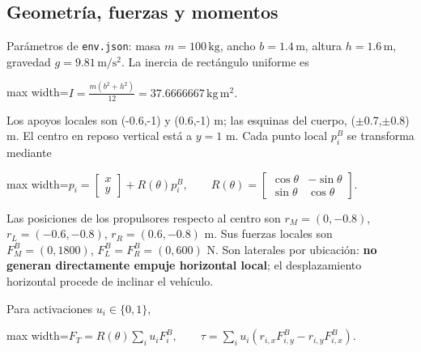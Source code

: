\documentclass[12pt,a4paper]{article}
\begin{document}
\subsection{Geometría,\allowbreak{} fuerzas y momentos}
Parámetros de \textcolor{Accent}{\nolinkurl{env.json}}: masa $m=100\,\mathrm{kg}$,\allowbreak{} ancho $b=1.4\,\mathrm m$,\allowbreak{} altura $h=1.6\,\mathrm m$,\allowbreak{} gravedad $g=9.81\,\mathrm{m/s^2}$. La inercia de rectángulo uniforme es



\begin{center}\begin{adjustbox}{max width=\linewidth}$\displaystyle I=\frac{m(b^2+h^2)}{12}=37.6666667\,\mathrm{kg\,m^2}.$\end{adjustbox}\end{center}



Los apoyos locales son (-0.6,\allowbreak{}-1) y (0.6,\allowbreak{}-1) m; las esquinas del cuerpo,\allowbreak{} (\ensuremath{\pm}0.7,\allowbreak{}\ensuremath{\pm}0.8) m. El centro en reposo vertical está a $y=1$ m. Cada punto local $p_i^B$ se transforma mediante



\begin{center}\begin{adjustbox}{max width=\linewidth}$\displaystyle p_i=\begin{bmatrix}x\\y\end{bmatrix}+R(\theta)p_i^B,
\qquad R(\theta)=\begin{bmatrix}\cos\theta&-\sin\theta\\\sin\theta&\cos\theta\end{bmatrix}.$\end{adjustbox}\end{center}



Las posiciones de los propulsores respecto al centro son $r_M=(0,-0.8)$,\allowbreak{} $r_L=(-0.6,-0.8)$,\allowbreak{} $r_R=(0.6,-0.8)$ m. Sus fuerzas locales son $F_M^B=(0,1800)$,\allowbreak{} $F_L^B=F_R^B=(0,600)$ N. Son laterales por ubicación: \textbf{no generan directamente empuje horizontal local}; el desplazamiento horizontal procede de inclinar el vehículo.


Para activaciones $u_i\in\{0,1\}$,\allowbreak{}



\begin{center}\begin{adjustbox}{max width=\linewidth}$\displaystyle F_T=R(\theta)\sum_i u_i F_i^B,\qquad
\tau=\sum_i u_i(r_{i,x}F_{i,y}^B-r_{i,y}F_{i,x}^B).$\end{adjustbox}\end{center}
\end{document}
